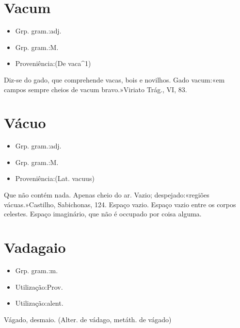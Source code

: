 \documentclass{article}
\begin{document}
\section{Vacum}
\begin{itemize}
\item {Grp. gram.:adj.}
\end{itemize}
\begin{itemize}
\item {Grp. gram.:M.}
\end{itemize}
\begin{itemize}
\item {Proveniência:(De \textunderscore vaca\textunderscore ^1)}
\end{itemize}
Diz-se do gado, que comprehende vacas, bois e novilhos.
Gado vacum:«\textunderscore em campos sempre cheios de vacum bravo.\textunderscore »\textunderscore Viriato Trág.\textunderscore , VI, 83.
\section{Vácuo}
\begin{itemize}
\item {Grp. gram.:adj.}
\end{itemize}
\begin{itemize}
\item {Grp. gram.:M.}
\end{itemize}
\begin{itemize}
\item {Proveniência:(Lat. \textunderscore vacuus\textunderscore )}
\end{itemize}
Que não contém nada.
Apenas cheio do ar.
Vazio; despejado:«\textunderscore regiões vácuas.\textunderscore »Castilho, \textunderscore Sabichonas\textunderscore , 124.
Espaço vazio.
Espaço vazio entre os corpos celestes.
Espaço imaginário, que não é occupado por coisa alguma.
\section{Vadagaio}
\begin{itemize}
\item {Grp. gram.:m.}
\end{itemize}
\begin{itemize}
\item {Utilização:Prov.}
\end{itemize}
\begin{itemize}
\item {Utilização:alent.}
\end{itemize}
Vágado, desmaio.
(Alter. de \textunderscore vádago\textunderscore , metáth. de \textunderscore vágado\textunderscore )
\end{document}
